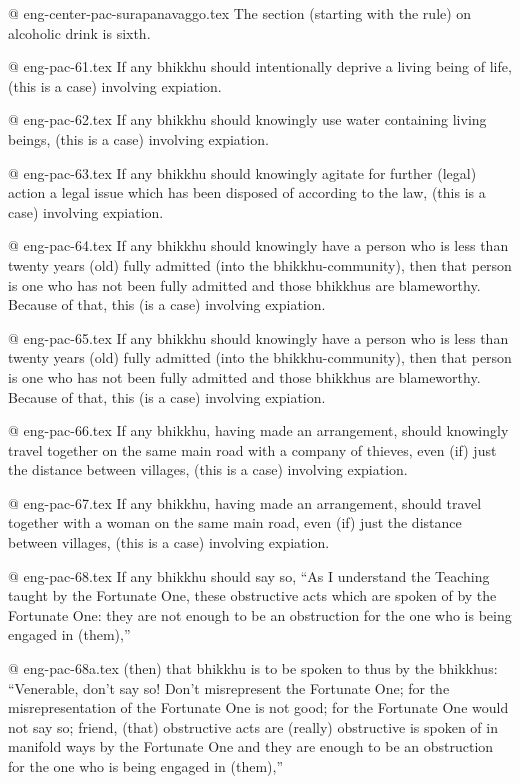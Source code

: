 @ eng-center-pac-surapanavaggo.tex
The section (starting with the rule) on alcoholic drink is sixth.

@ eng-pac-61.tex
If any bhikkhu should intentionally deprive a living being of life, (this is a case) involving expiation.

@ eng-pac-62.tex
If any bhikkhu should knowingly use water containing living beings, (this is a case) involving expiation.

@ eng-pac-63.tex
If any bhikkhu should knowingly agitate for further (legal) action a legal issue which has been disposed of according to the law, (this is a case) involving expiation.

@ eng-pac-64.tex
If any bhikkhu should knowingly have a person who is less than twenty years (old) fully admitted (into the bhikkhu-community), then that person is one who has not been fully admitted and those bhikkhus are blameworthy. Because of that, this (is a case) involving expiation.

@ eng-pac-65.tex
If any bhikkhu should knowingly have a person who is less than twenty years (old) fully admitted (into the bhikkhu-community), then that person is one who has not been fully admitted and those bhikkhus are blameworthy. Because of that, this (is a case) involving expiation.

@ eng-pac-66.tex
If any bhikkhu, having made an arrangement, should knowingly travel together on the same main road with a company of thieves, even (if) just the distance between villages, (this is a case) involving expiation.

@ eng-pac-67.tex
If any bhikkhu, having made an arrangement, should travel together with a woman on the same main road, even (if) just the distance between villages, (this is a case) involving expiation.

@ eng-pac-68.tex
If any bhikkhu should say so, “As I understand the Teaching taught by the Fortunate One, these obstructive acts which are spoken of by the Fortunate One: they are not enough to be an obstruction for the one who is being engaged in (them),” 

@ eng-pac-68a.tex
(then) that bhikkhu is to be spoken to thus by the bhikkhus: “Venerable, don't say so! Don't misrepresent the Fortunate One; for the misrepresentation of the Fortunate One is not good; for the Fortunate One would not say so; friend, (that) obstructive acts are (really) obstructive is spoken of in manifold ways by the Fortunate One and they are enough to be an obstruction for the one who is being engaged in (them),” 

